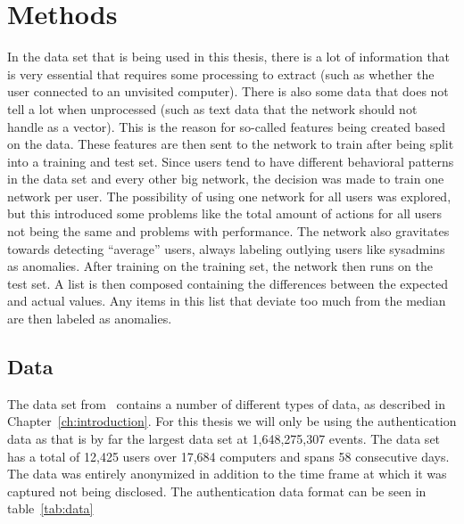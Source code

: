 \chapter{Methods}\label{ch:methods}

In the data set that is being used in this thesis, there is a lot of information that is very essential that requires some processing to extract (such as whether the user connected to an unvisited computer). There is also some data that does not tell a lot when unprocessed (such as text data that the network should not handle as a vector). This is the reason for so-called features being created based on the data. These features are then sent to the network to train after being split into a training and test set. Since users tend to have different behavioral patterns in the data set and every other big network, the decision was made to train one network per user. The possibility of using one network for all users was explored, but this introduced some problems like the total amount of actions for all users not being the same and problems with performance. The network also gravitates towards detecting \enquote{average} users, always labeling outlying users like sysadmins as anomalies. After training on the training set, the network then runs on the test set. A list is then composed containing the differences between the expected and actual values. Any items in this list that deviate too much from the median are then labeled as anomalies.

\section{Data}
The data set from~\cite{akent-2015-enterprise-data} contains a number of different types of data, as described in Chapter~\ref{ch:introduction}. For this thesis we will only be using the authentication data as that is by far the largest data set at 1,648,275,307 events. The data set has a total of 12,425 users over 17,684 computers and spans 58 consecutive days. The data was entirely anonymized in addition to the time frame at which it was captured not being disclosed. The authentication data format can be seen in table~\ref{tab:data}

